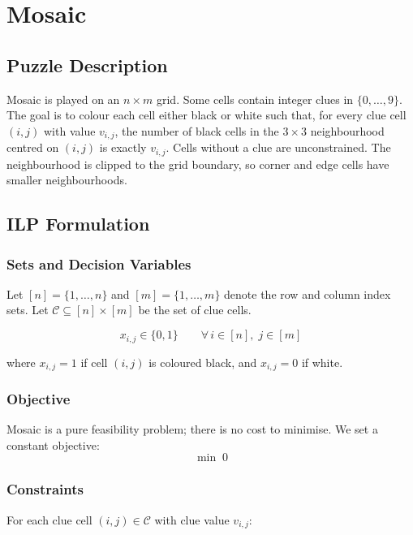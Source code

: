 \section{Mosaic}
\label{sec:mosaic}

\subsection{Puzzle Description}

Mosaic is played on an $n \times m$ grid. Some cells contain integer clues in $\{0, \ldots, 9\}$. The goal is to colour each cell either black or white such that, for every clue cell $(i,j)$ with value $v_{i,j}$, the number of black cells in the $3\times 3$ neighbourhood centred on $(i,j)$ is exactly $v_{i,j}$. Cells without a clue are unconstrained. The neighbourhood is clipped to the grid boundary, so corner and edge cells have smaller neighbourhoods.

\subsection{ILP Formulation}

\subsubsection{Sets and Decision Variables}

Let $[n] = \{1, \ldots, n\}$ and $[m] = \{1, \ldots, m\}$ denote the row and column index sets. Let $\mathcal{C} \subseteq [n] \times [m]$ be the set of clue cells.

\[
  x_{i,j} \in \{0, 1\} \qquad \forall\, i \in [n],\; j \in [m]
\]

where $x_{i,j} = 1$ if cell $(i,j)$ is coloured black, and $x_{i,j} = 0$ if white.

\subsubsection{Objective}

Mosaic is a pure feasibility problem; there is no cost to minimise. We set a constant objective:
\[
  \min\; 0
\]

\subsubsection{Constraints}

For each clue cell $(i,j) \in \mathcal{C}$ with clue value $v_{i,j}$:

